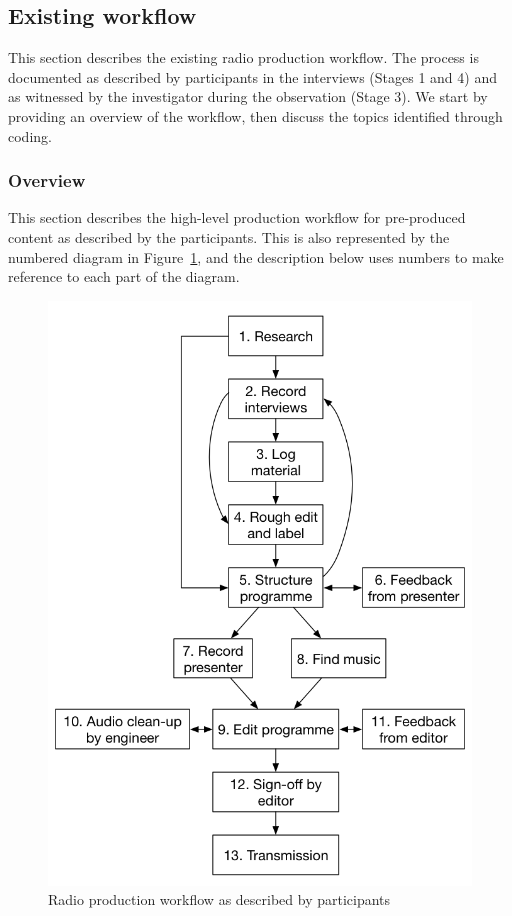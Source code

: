 \subsection{Existing workflow}\label{sec:resultsexisting}


This section describes the existing radio production workflow. The process is documented as described by participants
in the interviews (Stages 1 and 4) and as witnessed by the investigator during the observation (Stage 3).  We start by
providing an overview of the workflow, then discuss the topics identified through coding.

\subsubsection{Overview}

This section describes the high-level production workflow for pre-produced content as described by the
participants. This is also represented by the numbered diagram in Figure~\ref{fig:workflow}, and the description below
uses numbers to make reference to each part of the diagram.

\begin{figure}[ht]
\centering
  \includegraphics[width=.6\columnwidth]{figs/workflow.png}
  \caption{Radio production workflow as described by participants}
  \label{fig:workflow}
\end{figure}

